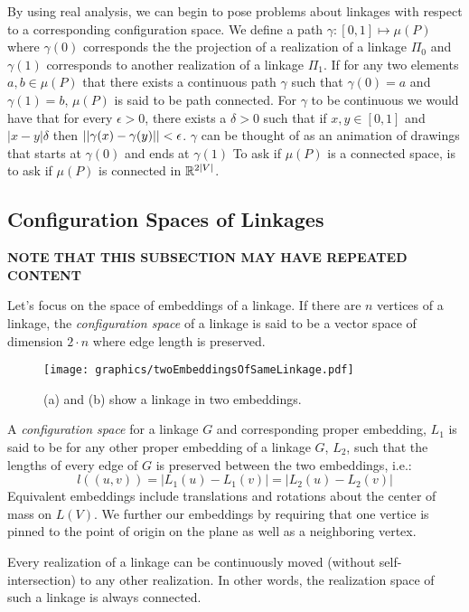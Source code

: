 By using real analysis, we can begin to pose problems about linkages with respect to a corresponding configuration space.  
We define a path $\gamma: [0,1]\mapsto \mu(P)$ where $\gamma(0)$ corresponds the the projection of a realization of a linkage $\Pi_0$ and $\gamma(1)$ corresponds to another realization of a linkage $\Pi_1$.  
If for any two elements $a,b \in \mu(P)$ that there exists a continuous path $\gamma$ such that $\gamma(0)=a$ and $\gamma(1)=b$, $\mu(P)$ is said to be path connected.   
For $\gamma$ to be continuous we would have that for every $\epsilon > 0$, there exists a $\delta >0$ such that if $x,y \in [0,1]$ and $\vert x-y \vert \delta$ then $\left\vert \left\vert \gamma(x)-\gamma(y) \right\vert \right\vert<\epsilon$.
$\gamma$ can be thought of as an animation of drawings that starts at $\gamma(0)$ and ends at $\gamma(1)$
To ask if $\mu(P)$ is a connected space, is to ask if $\mu(P)$ is connected in ${\mathbb{R}}^{2\vert V \vert}$.

\subsection{Configuration Spaces of Linkages}

\textbf{NOTE THAT THIS SUBSECTION MAY HAVE REPEATED CONTENT}

Let's focus on the space of embeddings of a linkage. If there are $n$ vertices of a linkage, 
the \textit{configuration space} of a linkage is said to be a vector space of dimension $2 \cdot n$ 
where edge length is preserved.  
\begin{figure}[!h]
\begin{center}
\texttt{[image: graphics/twoEmbeddingsOfSameLinkage.pdf]}
\end{center} 
\caption{(a) and (b) show a linkage in two embeddings.}
\label{fig:configuration-3}
\end{figure}
A \textit{configuration space} for a linkage $G$ and corresponding proper embedding, $L_1$ is said 
to be for any other proper embedding of a linkage $G$, $L_2$, such that the lengths 
of every edge of $G$ is preserved between the two embeddings, i.e.: 
$$l\left( \left(u,v\right) 
\right) = \left\vert 
L_1(u) - L_1(v) \right\vert = \left\vert L_2(u) - L_2(v) \right\vert$$
Equivalent embeddings include translations and rotations about the center of mass on $L(V)$.  We 
further our embeddings by requiring that one vertice is pinned to the point of origin on the plane 
as well as a neighboring vertex.

\begin{thm}
 Every realization of a linkage can be continuously moved (without 
self-intersection) to any other 
realization. In other words, the realization space of such a linkage is always connected.
\end{thm}

